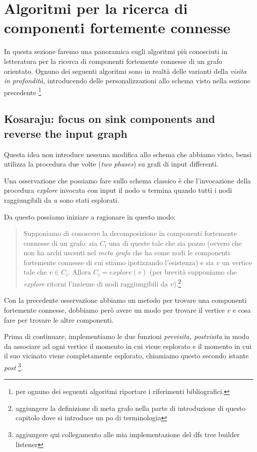\section{Algoritmi per la ricerca di componenti fortemente connesse}

In questa sezione faremo una panoramica sugli algoritmi pi\`u
conosciuti in letteratura per la ricerca di componenti fortemente
connesse di un grafo orientato. Ognuno dei seguenti algoritmi sono in
realt\`a delle varianti della \emph{visita in profondit\`a},
introducendo delle personalizzazioni allo schema visto nella sezione
precedente \footnote{per ognuno dei seguenti algoritmi riportare i
  riferimenti bibliografici.}

\subsection{Kosaraju: focus on sink components and reverse the input
  graph}
\label{subsection:kosaraju-algorithm}
Questa idea non introduce nessuna modifica allo schema che abbiamo
visto, bens\`i utilizza la procedura due volte (\emph{two phases}) su
grafi di input differenti.

Una osservazione che possiamo fare sullo schema classico \`e che
l'invocazione della procedura \emph{explore} invocata con input il
nodo $u$ termina quando tutti i nodi raggiungibili da $u$ sono stati
esplorati.

Da questo possiamo iniziare a ragionare in questo modo:
\begin{quotation}
  Supponiamo di conoscere la decomposizione in componenti fortemente
  connesse di un grafo: sia $C_{i}$ una di queste tale che sia pozzo
  (ovvero che non ha archi uscenti nel \emph{meta grafo} che ha come
  nodi le componenti fortemente connesse di cui stiamo ipotizzando
  l'esistenza) e sia $v$ un vertice tale che $v \in C_{i}$. Allora
  $C_{i} = explore(v)$ (per brevit\`a supponiamo che \emph{explore}
  ritorni l'insieme di nodi raggiungibili da $v$).\footnote{aggiungere
    la definizione di meta grafo nella parte di introduzione di questo
    capitolo dove si introduce un po di terminologia}
\end{quotation}

Con la precedente osservazione abbiamo un metodo per trovare una
componenti fortemente connesse, dobbiamo per\`o avere un modo per
trovare il vertice $v$ e cosa fare per trovare le altre componenti.

Prima di continuare, implementiamo le due funzioni \emph{previsita,
  postvisita} in modo da associare ad ogni vertice il momento in cui
viene esplorato e il momento in cui il suo vicinato viene
completamente esplorato, chiamiamo questo secondo istante \emph{post}
\footnote{aggiungere qui collegamento alle mia implementazione del dfs
  tree builder listener}.


